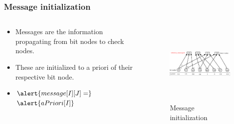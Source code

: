 \documentclass[xcolor=dvipsname]
{beamer}
\begin{document}
\begin{frame}[t]
\frametitle{ Message initialization }  
\begin{columns}[totalwidth=\textwidth]
	\begin{column}{0.4\textwidth}
	\centering
	\begin{itemize}
	\item Messages are the information propagating from bit nodes to check nodes.
	\item These are initialized to a priori of their respective bit node.	
	\item 	$ \alert{message[I][J] =} 
	$
	$
	\alert{aPriori[I]} 
	$ 
	\end{itemize}
 
			
	\end{column}%
	   		
	\begin{column}{0.6\textwidth}
	\centering
	\begin{figure}
	\includegraphics[height=4cm,width=7cm]{minSum3}
	\caption{ Message initialization }
	\end{figure}
	\end{column}%
\end{columns}
\end{frame}
\end{document}
